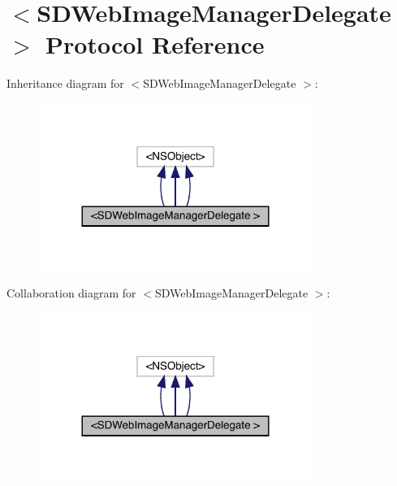 \hypertarget{protocol_s_d_web_image_manager_delegate_01-p}{}\section{$<$S\+D\+Web\+Image\+Manager\+Delegate $>$ Protocol Reference}
\label{protocol_s_d_web_image_manager_delegate_01-p}


Inheritance diagram for $<$S\+D\+Web\+Image\+Manager\+Delegate $>$\+:\nopagebreak
\begin{figure}[H]
\begin{center}
\leavevmode
\includegraphics[width=252pt]{protocol_s_d_web_image_manager_delegate_01-p__inherit__graph}
\end{center}
\end{figure}


Collaboration diagram for $<$S\+D\+Web\+Image\+Manager\+Delegate $>$\+:\nopagebreak
\begin{figure}[H]
\begin{center}
\leavevmode
\includegraphics[width=252pt]{protocol_s_d_web_image_manager_delegate_01-p__coll__graph}
\end{center}
\end{figure}
